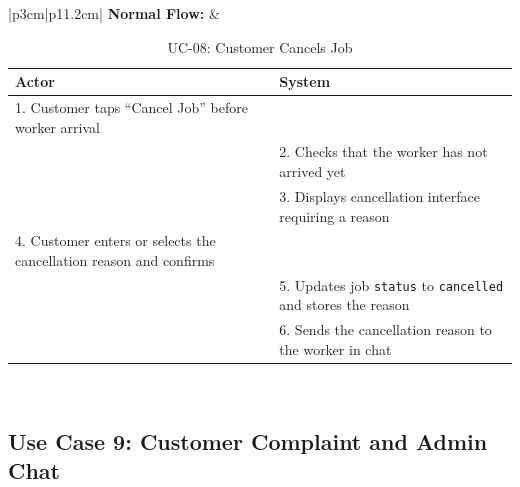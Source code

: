 {\small
\renewcommand{\arraystretch}{1.05}
\begin{table}[H]
\centering
\begin{tabular}{|p{3cm}|p{11.2cm}|}
\hline
\textbf{Normal Flow:} &
\begin{tabular}[t]{|p{5.4cm}|p{5.4cm}|}
\hline
\textbf{Actor} & \textbf{System} \\ \hline
1. Customer taps ``Cancel Job'' before worker arrival & \\ \hline
 & 2. Checks that the worker has not arrived yet \\ \hline
 & 3. Displays cancellation interface requiring a reason \\ \hline
4. Customer enters or selects the cancellation reason and confirms & \\ \hline
 & 5. Updates job \texttt{status} to \texttt{cancelled} and stores the reason \\ \hline
 & 6. Sends the cancellation reason to the worker in chat \\ \hline
\end{tabular} \\ \hline
\end{tabular}
\caption{UC-08: Customer Cancels Job}
\end{table}
}

\newpage


\subsection*{Use Case 9: Customer Complaint and Admin Chat}

